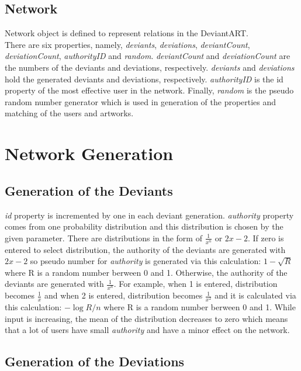 \documentclass[12pt,a4paper]{report}
\begin{document}
\section{Network} 

	\hspace{0.6cm}Network object is defined to represent relations in the DeviantART. \\

	There are six properties, namely, \emph{deviants}, \emph{deviations}, \emph{deviantCount}, \emph{deviationCount}, \emph{authorityID} and \emph{random}.	 \emph{deviantCount} and \emph{deviationCount} are the numbers of the deviants and deviations, respectively. \emph{deviants} and \emph{deviations} hold the generated deviants and deviations, respectively. \emph{authorityID} is the {id} property of the most effective user in the network. Finally, \emph{random} is the pseudo random number generator which is used in generation of the properties and matching of the users and artworks. 

\chapter{Network Generation}

\section{Generation of the Deviants}

	\hspace{0.6cm}\emph{id} property is incremented by one in each deviant generation. \emph{authority} property comes from one probability distribution and this distribution is chosen by the given parameter. There are distributions in the form of $\frac{1}{x^n}$ or $2x - 2$. If zero is entered to select distribution, the authority of the deviants are generated with $2x - 2$ so pseudo number for \emph{authority} is generated via this calculation: $1 - \sqrt R $ where R is a random number berween 0 and 1. Otherwise, the authority of the deviants are generated with $\frac{1}{x^n}$. For example, when 1 is entered, distribution becomes $\frac{1}{x}$ and when 2 is entered, distribution becomes $\frac{1}{x^2}$ and it is calculated via this calculation: $-\log R/ n$ where R is a random number berween 0 and 1. While input is increasing, the mean of the distribution decreases to zero which means that a lot of users have small \emph{authority} and have a minor effect on the network.    


\section{Generation of the Deviations}
\end{document}
